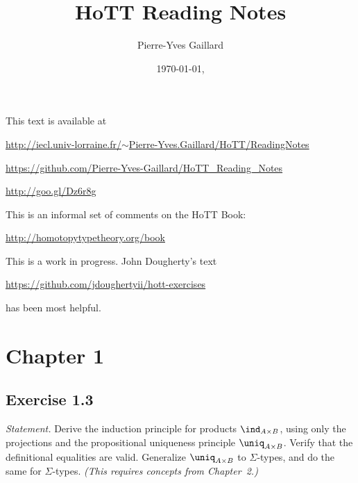 \documentclass[12pt]{article}
\title{HoTT Reading Notes}
\author{Pierre-Yves Gaillard}
\date{\today, \currenttime}
\begin{document}

\maketitle%

\nn This text is available at 

\nn\href{http://iecl.univ-lorraine.fr/~Pierre-Yves.Gaillard/HoTT/ReadingNotes}{http://iecl.univ-lorraine.fr/$\sim$Pierre-Yves.Gaillard/HoTT/ReadingNotes}


\nn\href{https://github.com/Pierre-Yves-Gaillard/HoTT_Reading_Notes}{https://github.com/Pierre-Yves-Gaillard/HoTT\_Reading\_Notes}

\nn\href{http://goo.gl/Dz6r8g}{http://goo.gl/Dz6r8g}

This is an informal set of comments on the HoTT Book:

\nn\href{http://homotopytypetheory.org/book}{http://homotopytypetheory.org/book}

This is a work in progress. John Dougherty's text 

\nn\href{https://github.com/jdoughertyii/hott-exercises}{https://github.com/jdoughertyii/hott-exercises}

\nn has been most helpful.

\tableofcontents%


\section{Chapter 1}

\subsection{Exercise 1.3} 

\emph{Statement.} Derive the induction principle for products $\ind_{A\times B}$, using only the projections and the propositional uniqueness principle $\uniq_{A\times B}$. Verify that the definitional equalities are valid. Generalize $\uniq_{A\times B}$ to $\Sigma$-types, and do the same for $\Sigma$-types. \emph{(This requires concepts from Chapter~2.)}
\end{document}
